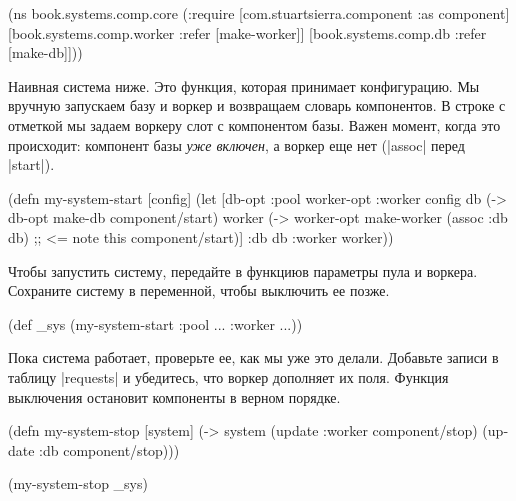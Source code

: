 \begin{english}
  \begin{clojure}
(ns book.systems.comp.core
  (:require
   [com.stuartsierra.component :as component]
   [book.systems.comp.worker :refer [make-worker]]
   [book.systems.comp.db :refer [make-db]]))
  \end{clojure}
\end{english}

Наивная система ниже. Это функция, которая принимает конфигурацию. Мы вручную
запускаем базу и воркер и возвращаем словарь компонентов. В строке с отметкой мы
задаем воркеру слот с компонентом базы. Важен момент, когда это происходит:
компонент базы \emph{уже включен}, а воркер еще нет (\spverb|assoc| перед
\spverb|start|).

\begin{english}
  \begin{clojure}
(defn my-system-start
  [config]
  (let [{db-opt :pool
         worker-opt :worker} config
        db (-> db-opt
               make-db
               component/start)
        worker (-> worker-opt
                   make-worker
                   (assoc :db db) ;; <= note this
                   component/start)]
    {:db db :worker worker}))
  \end{clojure}
\end{english}

Чтобы запустить систему, передайте в функциюв параметры пула и
воркера. Сохраните систему в переменной, чтобы выключить ее позже.

\begin{english}
  \begin{clojure}
(def _sys (my-system-start {:pool {...} :worker {...}}))
  \end{clojure}
\end{english}

Пока система работает, проверьте ее, как мы уже это делали. Добавьте записи в
таблицу \spverb|requests| и убедитесь, что воркер дополняет их поля. Функция
выключения остановит компоненты в верном порядке.

\begin{english}
  \begin{clojure}
(defn my-system-stop
  [system]
  (-> system
      (update :worker component/stop)
      (update :db component/stop)))

(my-system-stop _sys)
  \end{clojure}
\end{english}

